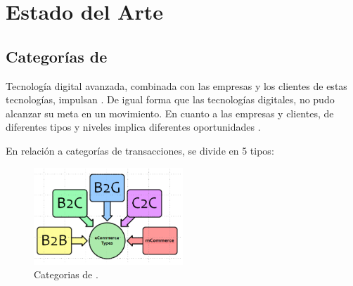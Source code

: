 \chapter{Estado del Arte}\label{cap:estadoArte}



%
%

\section{Categorías de \ecommerce}

Tecnología digital avanzada, combinada con las empresas y los clientes de estas tecnologías, impulsan \ecommerce. De igual forma que las tecnologías digitales, \ecommerce no pudo alcanzar su meta en un movimiento. En cuanto a las empresas y clientes, \ecommerce de diferentes tipos y niveles implica diferentes oportunidades \cite{zheng2009fundamentals}.

En relación a categorías de transacciones, \ecommerce se divide en 5 tipos:
\begin{figure}[h!]
	\centering
	\includegraphics[width=0.5\textwidth]{figuras/ecommerce_types.png}
	\caption{Categorias de \ecommerce.}
\end{figure}

